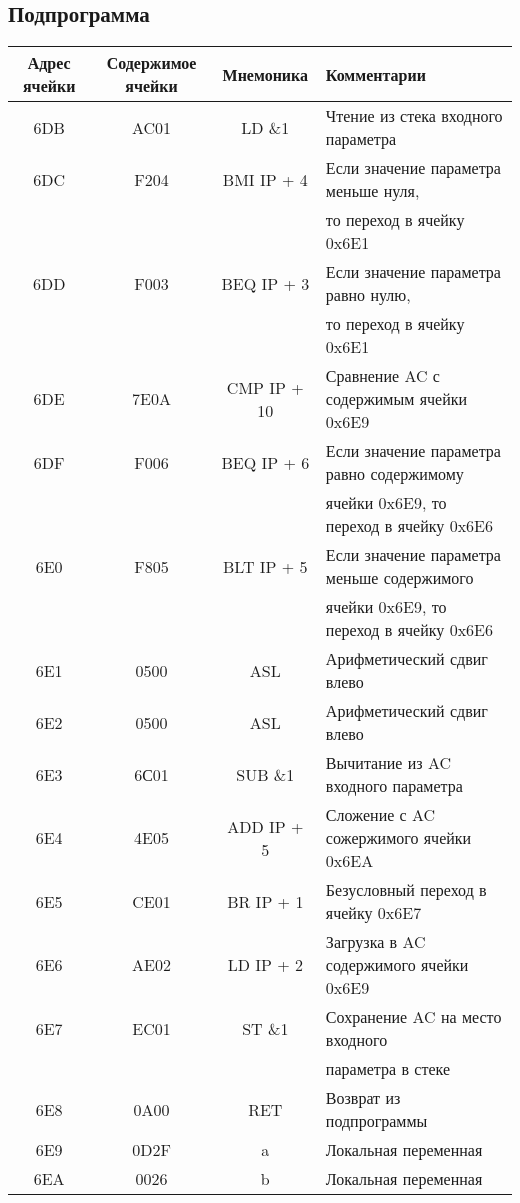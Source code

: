 \newpage




\subsection{Подпрограмма}
\begin{center}
	\begin{tabular}{|c|c|c|l|}
		\hline
		\textbf{Адрес ячейки} & \textbf{Содержимое ячейки} & \textbf{Мнемоника} & \textbf{Комментарии}\\
		\hline
		6DB & AC01 & LD \&1 & Чтение из стека входного параметра \\
		6DC & F204 & BMI IP + 4 & Если значение параметра меньше нуля,\\
		& & & то переход в ячейку 0x6E1 \\
		6DD & F003 & BEQ IP + 3 & Если значение параметра равно нулю, \\
		& & &то переход в ячейку 0x6E1 \\
		6DE & 7E0A & CMP IP + 10 & Сравнение AC с содержимым ячейки 0x6E9 \\
		6DF & F006 & BEQ IP + 6 & Если значение параметра равно содержимому\\
		&&&  ячейки 0x6E9, то переход в ячейку 0x6E6 \\
		6E0 & F805 & BLT IP + 5 & Если значение параметра меньше содержимого\\
		&&& ячейки 0x6E9, то переход в ячейку 0x6E6 \\
		6E1 & 0500 & ASL & Арифметический сдвиг влево \\
		6E2 & 0500 & ASL & Арифметический сдвиг влево \\
		6E3 & 6С01 & SUB \&1 & Вычитание из AC входного параметра \\
		6E4 & 4E05 & ADD IP + 5 & Сложение с AC сожержимого ячейки 0x6EA \\
		6E5 & CE01 & BR IP + 1 & Безусловный переход в ячейку 0x6E7 \\
		6E6 & AE02 & LD IP + 2 & Загрузка в AC содержимого ячейки 0x6E9\\
		6E7 & EC01 & ST \&1 & Сохранение AC на место входного \\
		&&&параметра в стеке \\
		6E8 & 0A00 & RET & Возврат из подпрограммы \\
		\hline
		6E9 & 0D2F & a & Локальная переменная \\
		6EA & 0026 & b & Локальная переменная \\
		\hline
		
	\end{tabular}
\end{center}

